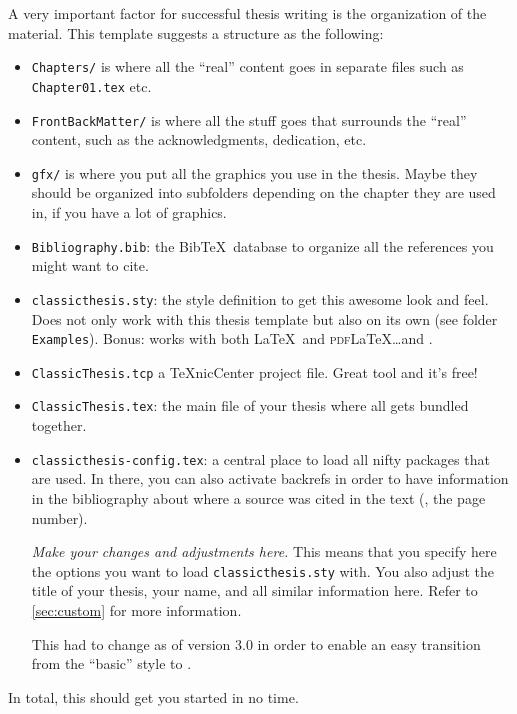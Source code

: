 A very important factor for successful thesis writing is the
organization of the material. This template suggests a structure as
the following:
\begin{itemize}
    \item\texttt{Chapters/} is where all the ``real'' content goes in
    separate files such as \texttt{Chapter01.tex} etc.
    \item\texttt{FrontBackMatter/} is where all the stuff goes that
    surrounds the ``real'' content, such as the acknowledgments,
    dedication, etc.
    \item\texttt{gfx/} is where you put all the graphics you use in
    the thesis. Maybe they should be organized into subfolders
    depending on the chapter they are used in, if you have a lot of
    graphics.
    \item\texttt{Bibliography.bib}: the Bib\TeX\ database to organize
    all the references you might want to cite.
    \item\texttt{classicthesis.sty}: the style definition to get this
    awesome look and feel. Does not only work with this thesis template
    but also on its own (see folder \texttt{Examples}). Bonus: works
    with both \LaTeX\ and \textsc{pdf}\LaTeX\dots and \mLyX.
    \item\texttt{ClassicThesis.tcp} a \TeX nicCenter project file.
    Great tool and it's free!
    \item\texttt{ClassicThesis.tex}: the main file of your thesis
    where all gets bundled together.
    \item\texttt{classicthesis-config.tex}: a central place to load all 
    nifty packages that are used. In there, you can also activate 
    backrefs in order to have information in the bibliography about 
    where a source was cited in the text (\ie, the page number).
    
    \emph{Make your changes and adjustments here.} This means that you  
    specify here the options you want to load \texttt{classicthesis.sty} 
    with. You also adjust the title of your thesis, your name, and all 
    similar information here. Refer to \autoref{sec:custom} for more 
    information.
    
		This had to change as of version 3.0 in order to enable an easy 
		transition from the ``basic'' style to \mLyX.
    
\end{itemize}
In total, this should get you started in no time.


